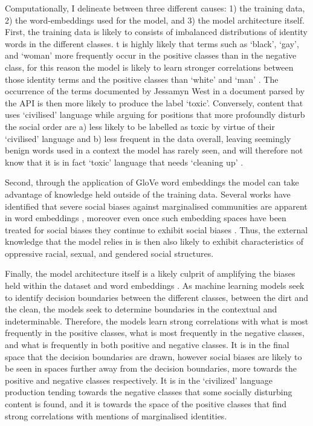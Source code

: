 Computationally, I delineate between three different causes: 1) the training data, 2) the word-embeddings used for the model, and 3) the model architecture itself.
First, the training data is likely to consists of imbalanced distributions of identity words in the different classes. 
t is highly likely that terms such as `black', `gay', and `woman' more frequently occur in the positive classes than in the negative class, for this reason the model is likely to learn stronger correlations between those identity terms and the positive classes than `white' and `man' \citep{Dixon:2018}.
The occurrence of the terms documented by Jessamyn West in a document parsed by the API is then more likely to produce the label `toxic'.
Conversely, content that uses `civilised' language while arguing for positions that more profoundly disturb the social order are a) less likely to be labelled as toxic by virtue of their `civilised' language and b) less frequent in the data overall, leaving seemingly benign words used in a context the model has rarely seen, and will therefore not know that it is in fact `toxic' language that needs `cleaning up' \cite{Dias:2021}.

Second, through the application of GloVe word embeddings \cite{Pennington:2014} the model can take advantage of knowledge held outside of the training data.
Several works have identified that severe social biases against marginalised communities are apparent in word embeddings \cite{Speer:2017,Bolukbasi:2016,Nissim:2020,Zhao:2017,Zhao:2020}, moreover even once such embedding spaces have been treated for social biases they continue to exhibit social biases \cite{Gonen:2019}.
Thus, the external knowledge that the model relies in is then also likely to exhibit characteristics of oppressive racial, sexual, and gendered social structures.

Finally, the model architecture itself is a likely culprit of amplifying the biases held within the dataset and word embeddings \cite{Zhao:2017}.
As machine learning models seek to identify decision boundaries between the different classes, between the dirt and the clean, the models seek to determine boundaries in the contextual and indeterminable.
Therefore, the models learn strong correlations with what is most frequently in the positive classes, what is most frequently in the negative classes, and what is frequently in both positive and negative classes.
It is in the final space that the decision boundaries are drawn, however social biases are likely to be seen in spaces further away from the decision boundaries, more towards the positive and negative classes respectively. 
It is in the `civilized' language production tending towards the negative classes that some socially disturbing content is found, and it is towards the space of the positive classes that find strong correlations with mentions of marginalised identities.
\vspace{5mm}

